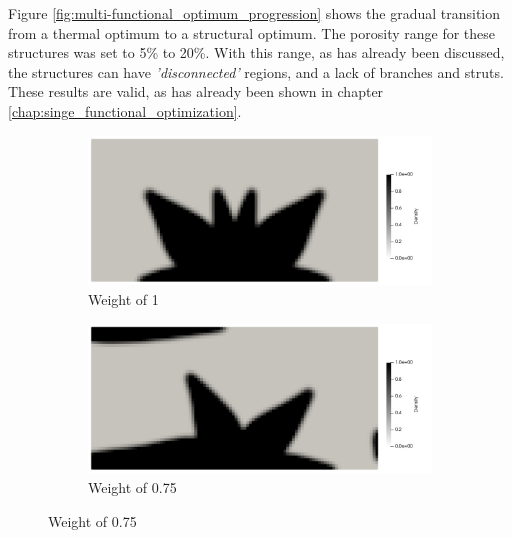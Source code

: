 Figure \ref{fig:multi-functional_optimum_progression} shows the gradual transition from a thermal optimum to a structural optimum. The porosity range for these structures was set to 5\% to 20\%. With this range, as has already been discussed, the structures can have \emph{'disconnected'} regions, and a lack of branches and struts. These results are valid, as has already been shown in chapter \ref{chap:singe_functional_optimization}.
\begin{figure}[ht]
    \centering
    \begin{subfigure}[b]{0.45\linewidth}
        \includegraphics[width=\linewidth]{figures/chapter_5/MF_1to0.png}
        \caption{Weight of 1}
    \end{subfigure}
    \hfill
    \begin{subfigure}[b]{0.45\linewidth}
        \includegraphics[width=\linewidth]{figures/chapter_5/MF_3to1.png}
        \caption{Weight of 0.75}
    \end{subfigure}


\end{figure}
